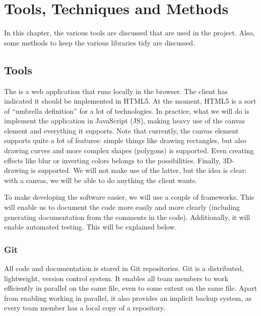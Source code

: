 \chapter{Tools, Techniques and Methods}
\label{chap:tools}
In this chapter, the various tools are discussed that are used in the \projectname{} project. Also, some methods to keep the various libraries tidy are discussed.

\section{Tools}
\label{sec:tools}
The \applicationname{} is a web application that runs locally in the browser. The client has indicated it should be implemented in HTML5. At the moment, HTML5 is a sort of ``umbrella definition'' for a lot of technologies. In practice, what we will do is implement the application in JavaScript (JS), making heavy use of the canvas element and everything it supports. Note that currently, the canvas element supports quite a lot of features: simple things like drawing rectangles, but also drawing curves and more complex shapes (polygons) is supported. Even creating effects like blur or inverting colors belongs to the possibilities. Finally, 3D-drawing is supported. We will not make use of the latter, but the idea is clear: with a canvas, we will be able to do anything the client wants.

To make developing the software easier, we will use a couple of frameworks. This will enable us to document the code more easily and more clearly (including generating documentation from the comments in the code). Additionally, it will enable automated testing. This will be explained below.

\subsection{Git}
\label{subsec:tools-git}
All code and documentation is stored in Git repositories. Git is a distributed, lightweight, version control system. It enables all team members to work efficiently in parallel on the same file, even to some extent on the same file. Apart from enabling working in parallel, it also provides an implicit backup system, as every team member has a local copy of a repository.

